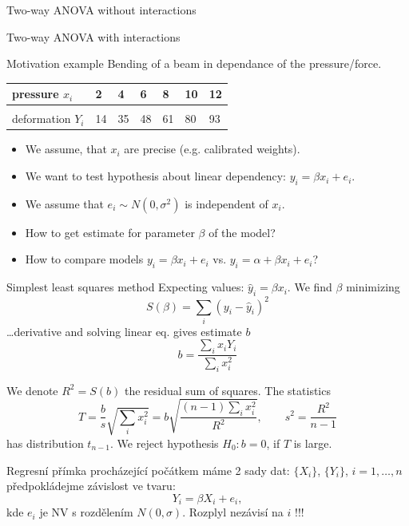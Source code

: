 \documentclass[smaller]{beamer}
\def\df#1{{\usebeamercolor[fg]{my orange} #1}}
\def\xskip{{\vspace{2ex}}}
\begin{document}
\begin{frame}{Two-way ANOVA without interactions}
\end{frame}

\begin{frame}{Two-way ANOVA with interactions}
\end{frame}


\begin{frame}{Motivation example}
 Bending of a beam in dependance of the pressure/force.

 \begin{center}
\begin{tabular}{l|llllll}
pressure $x_i$ & 2 & 4 & 6 & 8 & 10 & 12\\
\hline\\
deformation $Y_i$ & 14 & 35 & 48 & 61 & 80 & 93\\
\end{tabular}
\end{center}

\xskip
\begin{itemize}
  \item We assume, that $x_i$ are precise (e.g. calibrated weights).
  \item We want to test hypothesis about linear dependency: $y_i= \beta x_i + e_i$.
  \item We assume that $e_i \sim N(0,\sigma^2)$ is independent of $x_i$.
  \item How to get estimate for parameter $\beta$ of the model?
  \item How to compare models $y_i=\beta x_i+e_i$ vs. $y_i=\alpha + \beta x_i +e_i$?
\end{itemize}  
\end{frame}

\begin{frame}{Simplest least squares method}
 Expecting values: $\hat{y}_i = \beta x_i$. We find $\beta$ minimizing
 \[
     S(\beta)= \sum_i (y_i - \hat{y}_i)^2 
 \]
 \dots derivative and solving linear eq. gives estimate $b$
 \[
    b=\frac{\sum_i x_i Y_i}{\sum_i x_i^2}
 \]
 
 We denote $R^2=S(b)$ the \df{residual sum of squares}. The statistics
 \[
    T=\frac{b}{s}\sqrt{\sum_i x_i^2}= b\sqrt{\frac{(n-1)\sum_i x_i^2}{R^2}}, \qquad s^2 = \frac{R^2}{n-1}
 \]
 has distribution $t_{n-1}$. We reject hypothesis $H_0: b=0$, if $T$ is large.
\end{frame}


\begin{frame}{Regresní přímka procházející počátkem}
 máme 2 sady dat: $\{X_i\}$, $\{Y_i\}$, $i=1,\dots,n$
 předpokládejme závislost ve tvaru:
 \[
    Y_i = \beta X_i + e_i,
 \]
 kde $e_i$ je NV s rozdělením $N(0,\sigma)$. Rozplyl nezávisí na $i$ !!! 
 
\end{frame}
\end{document}
